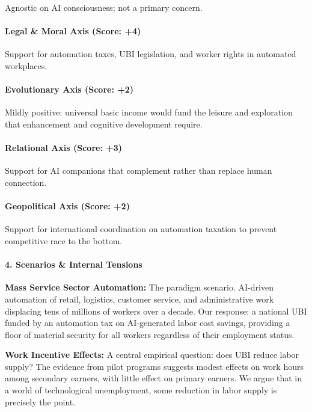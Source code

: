 Agnostic on AI consciousness; not a primary concern.

\paragraph{Legal \& Moral Axis (Score:
+4)}\label{legal-moral-axis-score-4-4}

Support for automation taxes, UBI legislation, and worker rights in
automated workplaces.

\paragraph{Evolutionary Axis (Score:
+2)}\label{evolutionary-axis-score-2-4}

Mildly positive: universal basic income would fund the leisure and
exploration that enhancement and cognitive development require.

\paragraph{Relational Axis (Score: +3)}\label{relational-axis-score-3-1}

Support for AI companions that complement rather than replace human
connection.

\paragraph{Geopolitical Axis (Score:
+2)}\label{geopolitical-axis-score-2-8}

Support for international coordination on automation taxation to prevent
competitive race to the bottom.

\paragraph{4. Scenarios \& Internal
Tensions}\label{scenarios-internal-tensions-43}

\textbf{Mass Service Sector Automation:} The paradigm scenario.
AI-driven automation of retail, logistics, customer service, and
administrative work displacing tens of millions of workers over a
decade. Our response: a national UBI funded by an automation tax on
AI-generated labor cost savings, providing a floor of material security
for all workers regardless of their employment status.

\textbf{Work Incentive Effects:} A central empirical question: does UBI
reduce labor supply? The evidence from pilot programs suggests modest
effects on work hours among secondary earners, with little effect on
primary earners. We argue that in a world of technological unemployment,
some reduction in labor supply is precisely the point.

